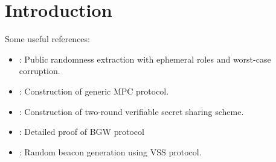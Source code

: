 \section{Introduction}


Some useful references:
\begin{itemize}
    \item \cite{C:NieRibObr22}: Public randomness extraction with ephemeral roles and worst-case corruption. 
    \item \cite{STOC:BenGolWig88}: Construction of generic MPC protocol.
    \item \cite{STOC:GIKR01}: Construction  of two-round verifiable secret sharing scheme.
    \item \cite{JC:AshLin17}: Detailed proof of BGW protocol
    \item \cite{SP:SJKGGK17}: Random beacon generation using VSS protocol.
\end{itemize}

